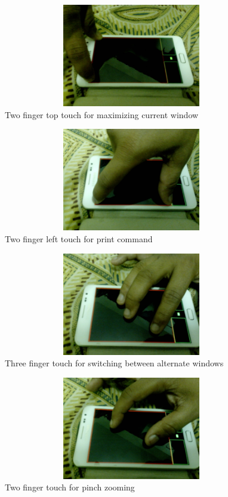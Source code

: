 \documentclass[10pt,conference,letterpaper]{IEEEtran}
\begin{document}
\begin{figure}
\centering
\includegraphics[width=120mm,height=45mm]{6.eps}
\caption{Two finger top touch for maximizing current window}
\end{figure}
\begin{figure}
\centering
\includegraphics[width=120mm,height=45mm]{7.eps}
\caption{Two finger left touch for print command}
\end{figure}
\begin{figure}
\centering
\includegraphics[width=120mm,height=45mm]{8.eps}
\caption{Three finger touch for switching between alternate windows}
\end{figure}
\begin{figure}
\centering
\includegraphics[width=120mm,height=45mm]{9.eps}
\caption{Two finger touch for pinch zooming}
\end{figure}
\end{document}
